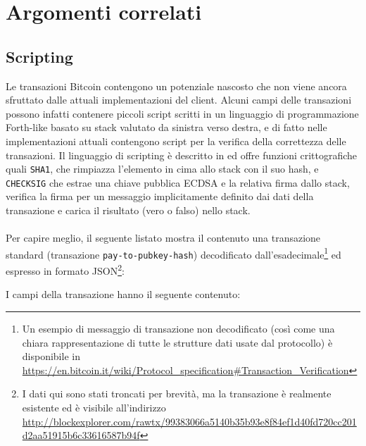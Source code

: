 \chapter{Argomenti correlati}

\section{Scripting}\label{transaction-scripting}

Le transazioni Bitcoin contengono un potenziale nascosto che non viene ancora sfruttato dalle attuali implementazioni del client.
Alcuni campi delle transazioni possono infatti contenere piccoli script scritti in un linguaggio di programmazione Forth-like basato su stack valutato da sinistra verso destra, e di fatto nelle implementazioni attuali contengono script per la verifica della correttezza delle transazioni. Il linguaggio di scripting è descritto in \cite{bitcoin-scripting-api} ed offre funzioni crittografiche quali \verb|SHA1|, che rimpiazza l'elemento in cima allo stack con il suo hash, e \verb|CHECKSIG| che estrae una chiave pubblica ECDSA e la relativa firma dallo stack, verifica la firma per un messaggio implicitamente definito dai dati della transazione e carica il risultato (vero o falso) nello stack.\\\\
Per capire meglio, il seguente listato mostra il contenuto una transazione standard (transazione \verb|pay-to-pubkey-hash|) decodificato dall'esadecimale\footnote{Un esempio di messaggio di transazione non decodificato (così come una chiara rappresentazione di tutte le strutture dati usate dal protocollo) è disponibile in \url{https://en.bitcoin.it/wiki/Protocol_specification\#Transaction_Verification} } ed espresso in formato JSON\footnote{I dati qui sono stati troncati per brevità, ma la transazione è realmente esistente ed è visibile all'indirizzo \url{http://blockexplorer.com/rawtx/99383066a5140b35b93e8f84ef1d40fd720cc201d2aa51915b6c33616587b94f}}:



I campi della transazione hanno il seguente contenuto:


